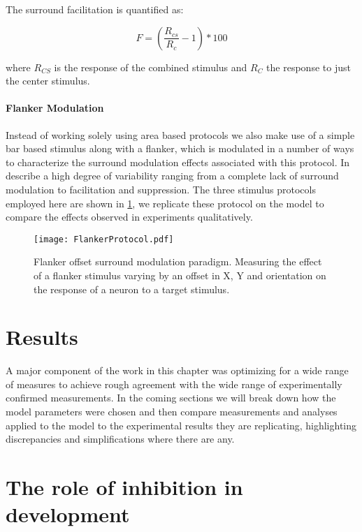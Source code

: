 The surround facilitation is quantified as:

\begin{equation}
F = (\frac{R_{cs}}{R_c} - 1) * 100
\end{equation}

where $R_{CS}$ is the response of the combined stimulus and $R_C$ the
response to just the center stimulus.

\paragraph{Flanker Modulation}

Instead of working solely using area based protocols we also make use
of a simple bar based stimulus along with a flanker, which is
modulated in a number of ways to characterize the surround modulation
effects associated with this protocol. In \cite{Kapadia1995} describe
a high degree of variability ranging from a complete lack of surround
modulation to facilitation and suppression. The three stimulus
protocols employed here are shown in \ref{Flanker}, we replicate these
protocol on the model to compare the effects observed in experiments
qualitatively.

\begin{figure}
	\centering
        \texttt{[image: FlankerProtocol.pdf]}
	\caption{Flanker offset surround modulation paradigm. Measuring
      the effect of a flanker stimulus varying by an offset in X, Y
      and orientation on the response of a neuron to a target
      stimulus.}
	\label{Flanker}
\end{figure}


\section{Results}

A major component of the work in this chapter was optimizing for a
wide range of measures to achieve rough agreement with the wide range
of experimentally confirmed measurements. In the coming sections we
will break down how the model parameters were chosen and then compare
measurements and analyses applied to the model to the experimental
results they are replicating, highlighting discrepancies and
simplifications where there are any.

\section{The role of inhibition in development}

